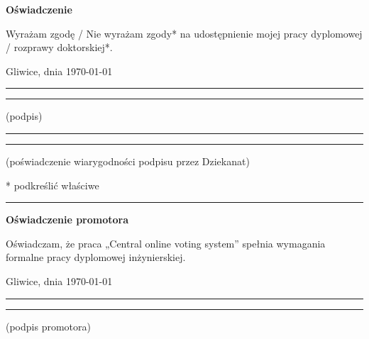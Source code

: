 \documentclass[a4paper,twoside,12pt]{book}
\newcommand{\Title}{Central online voting system}
\begin{document}
\vfill  

\begin{center}
\Large\bfseries Oświadczenie
\end{center}

\vfill

\foreignlanguage{polish}{Wyrażam  zgodę / Nie wyrażam zgody*  na  udostępnienie  mojej  pracy  dyplomowej / rozprawy doktorskiej*.}

\vfill

Gliwice, dnia {\today}

\vfill

\rule{0.5\textwidth}{0cm}\dotfill 

\rule{0.5\textwidth}{0cm}
\begin{minipage}{0.45\textwidth}
{\begin{center}(podpis)\end{center}}
\end{minipage} 

\vfill

\rule{0.5\textwidth}{0cm}\dotfill 

\rule{0.5\textwidth}{0cm}
\begin{minipage}{0.45\textwidth}
{\begin{center}\rule{0mm}{5mm}(poświadczenie wiarygodności podpisu przez Dziekanat)\end{center}}
\end{minipage}


\vfill

* podkreślić właściwe

 


\cleardoublepage

\rule{1cm}{0cm}

\vfill  

\begin{center}
\Large\bfseries Oświadczenie promotora
\end{center}

\vfill

\foreignlanguage{polish}{Oświadczam, że praca „\Title” spełnia wymagania formalne pracy dyplomowej inżynierskiej.}

\vfill



\vfill

Gliwice, dnia {\today}

\rule{0.5\textwidth}{0cm}\dotfill 

\rule{0.5\textwidth}{0cm}
\begin{minipage}{0.45\textwidth}
{\begin{center}(podpis promotora)\end{center}}
\end{minipage} 
\end{document}
